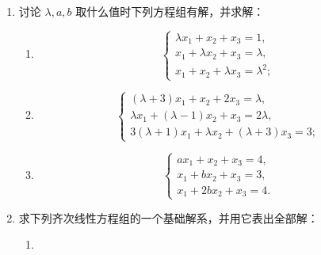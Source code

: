 \begin{enumerate}
\begin{enumerate}
\[\begin{pmatrix}
        35&30&15&20&5
      \end{pmatrix};
    \]
  \anssub
    \item \[
      \begin{pmatrix}
        1&0&0&1&4\\
        0&1&0&2&5\\
        0&0&1&3&6\\
        1&2&3&14&32\\
        4&5&6&32&77
      \end{pmatrix};
    \]
  \anssub
    \item \[
      \begin{pmatrix}
        1&0&1&0&0\\
        1&1&0&0&0\\
        0&1&1&0&0\\
        0&0&1&1&0\\
        0&1&0&1&1
      \end{pmatrix}.
    \]
  \anssub
  \end{enumerate}
  \item 讨论 $\lambda,a,b$ 取什么值时下列方程组有解，并求解：
  \begin{enumerate}
    \item \[
      \begin{cases}
        \lambda x_1+x_2+x_3=1,\\
        x_1+\lambda x_2+x_3=\lambda,\\
        x_1+x_2+\lambda x_3=\lambda^2;
      \end{cases}
    \]
  \anssub
    \item \[
      \begin{cases}
        (\lambda+3)x_1+x_2+2x_3=\lambda,\\
        \lambda x_1+(\lambda-1)x_2+x_3=2\lambda,\\
        3(\lambda+1)x_1+\lambda x_2+(\lambda+3)x_3=3;
      \end{cases}
    \]
  \anssub
    \item \[
      \begin{cases}
        ax_1+x_2+x_3=4,\\
        x_1+bx_2+x_3=3,\\
        x_1+2bx_2+x_3=4.
      \end{cases}
    \]
  \anssub
  \end{enumerate}
  \item 求下列齐次线性方程组的一个基础解系，并用它表出全部解：
  \begin{enumerate}
    \item \[
\]
\end{enumerate}
\end{enumerate}
